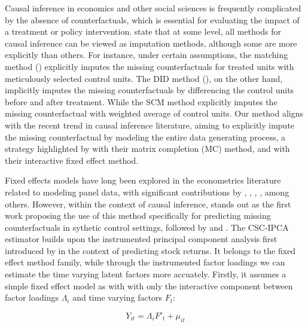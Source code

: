 \documentclass[12pt]{article}
\begin{document}
Causal inference in economics and other social sciences is frequently complicated by the absence of counterfactuals, which is essential for evaluating the impact of a treatment or policy intervention. \cite{imbens2015causal} state that at some level, all methods for causal inference can be viewed as imputation methods, although some are more explicitly than others. For instance, under certain assumptions, the matching method (\cite{abadie2006large, abadie2011bias}) explicitly imputes the missing counterfactuals for treated units with meticulously selected control units. The DID method (\cite{card1993minimum, ashenfelter1978estimating}), on the other hand, implicitly imputes the missing counterfactuals by differencing the control units before and after treatment. While the SCM method explicitly imputes the missing counterfactual with weighted average of control units. Our method aligns with the recent trend in causal inference literature, aiming to explicitly impute the missing counterfactual by modeling the entire data generating process, a strategy highlighted by \cite{athey2021matrix} with their matrix completion (MC) method, and \cite{xu2017generalized} with their interactive fixed effect method.

Fixed effects models have long been explored in the econometrics literature related to modeling panel data, with significant contributions by \cite{bai2003computation}, \cite{pesaran2006estimation}, \cite{stock2002forecasting}, \cite{eberhardt2009cross}, among others. However, within the context of causal inference, \cite{hsiao2012panel} stands out as the first work proposing the use of this method specifically for predicting missing counterfactuals in sythetic control settings, followed by \cite{gobillon2016regional, xu2017generalized, chan2016policy} and \cite{li2018inference}. The CSC-IPCA estimator builds upon the instrumented principal component analysis first introduced by \cite{kelly2020instrumented, kelly2019characteristics} in the context of predicting stock returns. It belongs to the fixed effect method family, while through the instrumented factor loadings we can estimate the time varying latent factors more accuately. Firstly, it assumes a simple fixed effect model as with \cite{bai2003computation} with only the interactive component between factor loadings $\Lambda_i$ and time varying factors $F_t$:

\begin{equation}
\label{eqn: static}
    Y_{it} = \Lambda_i F'_t + \mu_{it}
\end{equation}
\end{document}
